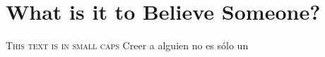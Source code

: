 \section{What is it to Believe Someone?}
\textsc{This text is in small caps}
Creer a alguien no es sólo un 

